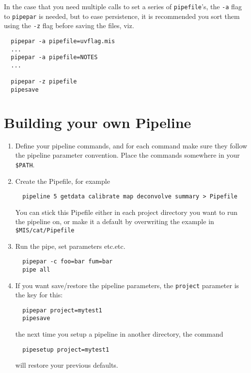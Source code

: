 \documentclass[preprint]{aastex} %
\begin{document}
In the case that you need multiple calls to set a series of {\tt pipefile}'s,
the {\tt -a} flag to {\tt pipepar} is needed, but to ease persistence, it 
is recommended you sort them using the {\tt -z} flag before saving the files,
viz.

\footnotesize
\begin{verbatim}
  pipepar -a pipefile=uvflag.mis
  ...
  pipepar -a pipefile=NOTES
  ...

  pipepar -z pipefile
  pipesave

\end{verbatim}
\normalsize 



\section{Building your own Pipeline}

\begin{enumerate}

\item
Define your pipeline commands, and for each command make sure they
follow the pipeline parameter convention. Place the commands somewhere
in your {\tt \$PATH}.
\item
Create the Pipefile, for example
\footnotesize
\begin{verbatim}
  pipeline 5 getdata calibrate map deconvolve summary > Pipefile
\end{verbatim}
\normalsize   
You can stick this Pipefile either in each project directory you
want to run the pipeline on, or make it a default by overwriting
the example in {\tt \$MIS/cat/Pipefile}
\item
Run the pipe, set parameters etc.etc.
\footnotesize
\begin{verbatim}
  pipepar -c foo=bar fum=bar
  pipe all
\end{verbatim}
\normalsize   


\item
If you want save/restore the pipeline parameters, the {\tt project}
parameter is the key for this:
\footnotesize
\begin{verbatim}
  pipepar project=mytest1
  pipesave
\end{verbatim}
\normalsize   

the next time you setup a pipeline in another directory, the command
\footnotesize
\begin{verbatim}
  pipesetup project=mytest1
\end{verbatim}
\normalsize   

will restore your previous defaults.


\end{enumerate}
\end{document}
